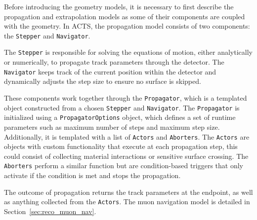 Before introducing the geometry models, it is necessary to first describe the propagation and extrapolation models as some of their components are coupled with the geometry. In ACTS, the propagation model consists of two components: the \texttt{Stepper} and \texttt{Navigator}. 

The \texttt{Stepper} is responsible for solving the equations of motion, either analytically or numerically, to propagate track parameters through the detector. The \texttt{Navigator} keeps track of the current position within the detector and dynamically adjusts the step size to ensure no surface is skipped.

These components work together through the \texttt{Propagator}, which is a templated object constructed from a chosen \texttt{Stepper} and \texttt{Navigator}. The \texttt{Propagator} is initialized using a \texttt{PropagatorOptions} object, which defines a set of runtime parameters such as maximum number of steps and maximum step size. Additionally, it is templated with a list of \texttt{Actors} and \texttt{Aborters}. The \texttt{Actors} are objects with custom functionality that execute at each propagation step, this could consist of collecting material interactions or sensitive surface crossing. The \texttt{Aborters} perform a similar function but are condition-based triggers that only activate if the condition is met and stops the propagation. 

The outcome of propagation returns the track parameters at the endpoint, as well as anything collected from the \texttt{Actors}. The muon navigation model is detailed in Section~\ref{sec:reco_muon_nav}.

